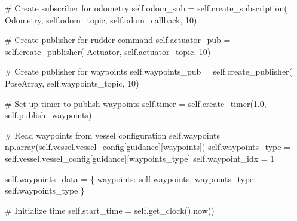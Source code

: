 \documentclass[
  letterpaper,
  DIV=11,
  numbers=noendperiod]{scrreprt}
\newenvironment{Shaded}{\begin{snugshade}}{\end{snugshade}}
\newcommand{\CommentTok}[1]{\textcolor[rgb]{0.37,0.37,0.37}{#1}}
\newcommand{\DecValTok}[1]{\textcolor[rgb]{0.68,0.00,0.00}{#1}}
\newcommand{\FloatTok}[1]{\textcolor[rgb]{0.68,0.00,0.00}{#1}}
\newcommand{\NormalTok}[1]{\textcolor[rgb]{0.00,0.23,0.31}{#1}}
\newcommand{\OperatorTok}[1]{\textcolor[rgb]{0.37,0.37,0.37}{#1}}
\newcommand{\StringTok}[1]{\textcolor[rgb]{0.13,0.47,0.30}{#1}}
\newcommand{\VariableTok}[1]{\textcolor[rgb]{0.07,0.07,0.07}{#1}}
\begin{document}
\begin{Shaded}
\begin{Highlighting}[]
        \CommentTok{\# Create subscriber for odometry}
        \VariableTok{self}\NormalTok{.odom\_sub }\OperatorTok{=} \VariableTok{self}\NormalTok{.create\_subscription(}
\NormalTok{            Odometry,}
            \VariableTok{self}\NormalTok{.odom\_topic,}
            \VariableTok{self}\NormalTok{.odom\_callback,}
            \DecValTok{10}\NormalTok{)}
            
        \CommentTok{\# Create publisher for rudder command}
        \VariableTok{self}\NormalTok{.actuator\_pub }\OperatorTok{=} \VariableTok{self}\NormalTok{.create\_publisher(}
\NormalTok{            Actuator,}
            \VariableTok{self}\NormalTok{.actuator\_topic,}
            \DecValTok{10}\NormalTok{)}
        
        \CommentTok{\# Create publisher for waypoints}
        \VariableTok{self}\NormalTok{.waypoints\_pub }\OperatorTok{=} \VariableTok{self}\NormalTok{.create\_publisher(}
\NormalTok{            PoseArray,}
            \VariableTok{self}\NormalTok{.waypoints\_topic,}
            \DecValTok{10}\NormalTok{)}
        
        \CommentTok{\# Set up timer to publish waypoints}
        \VariableTok{self}\NormalTok{.timer }\OperatorTok{=} \VariableTok{self}\NormalTok{.create\_timer(}\FloatTok{1.0}\NormalTok{, }\VariableTok{self}\NormalTok{.publish\_waypoints)}
        
        \CommentTok{\# Read waypoints from vessel configuration}
        \VariableTok{self}\NormalTok{.waypoints }\OperatorTok{=}\NormalTok{ np.array(}\VariableTok{self}\NormalTok{.vessel.vessel\_config[}\StringTok{\textquotesingle{}guidance\textquotesingle{}}\NormalTok{][}\StringTok{\textquotesingle{}waypoints\textquotesingle{}}\NormalTok{])}
        \VariableTok{self}\NormalTok{.waypoints\_type }\OperatorTok{=} \VariableTok{self}\NormalTok{.vessel.vessel\_config[}\StringTok{\textquotesingle{}guidance\textquotesingle{}}\NormalTok{][}\StringTok{\textquotesingle{}waypoints\_type\textquotesingle{}}\NormalTok{]}
        \VariableTok{self}\NormalTok{.waypoint\_idx }\OperatorTok{=} \DecValTok{1}

        \VariableTok{self}\NormalTok{.waypoints\_data }\OperatorTok{=}\NormalTok{ \{}
            \StringTok{\textquotesingle{}waypoints\textquotesingle{}}\NormalTok{: }\VariableTok{self}\NormalTok{.waypoints,}
            \StringTok{\textquotesingle{}waypoints\_type\textquotesingle{}}\NormalTok{: }\VariableTok{self}\NormalTok{.waypoints\_type}
\NormalTok{        \}}
        
        \CommentTok{\# Initialize time}
        \VariableTok{self}\NormalTok{.start\_time }\OperatorTok{=} \VariableTok{self}\NormalTok{.get\_clock().now()}


\end{Highlighting}
\end{Shaded}
\end{document}
